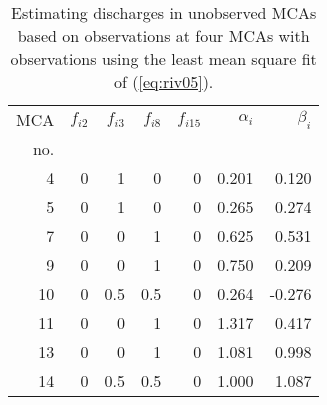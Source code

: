 \begin{table}[t]
 \caption{Estimating discharges in unobserved MCAs based on observations
 at four MCAs with observations using the least mean square fit of (\ref{eq:riv05}).}
 \label{tab:rivers04}       %
 \begin{center}
   \begin{tabular}{rrrrrrr}
   \hline
   MCA & $f_{i2}$ & $f_{i3}$ & $f_{i8}$ & $f_{i15}$ & $\alpha_i$ & $\beta_i$  \\
   no. &          &          &          &           &            &            \\ 
   \hline
   4   & 0        &  1       &  0       &  0        & 0.201      &  0.120     \\
   5   & 0        &  1       &  0       &  0        & 0.265      &  0.274     \\
   7   & 0        &  0       &  1       &  0        & 0.625      &  0.531     \\
   9   & 0        &  0       &  1       &  0        & 0.750      &  0.209     \\
   10  & 0        &  0.5     &  0.5     &  0        & 0.264      & -0.276     \\
   11  & 0        &  0       &  1       &  0        & 1.317      &  0.417     \\
   13  & 0        &  0       &  1       &  0        & 1.081      &  0.998     \\
   14  & 0        &  0.5     &  0.5     &  0        & 1.000      &  1.087     \\
   \hline
   \end{tabular}
 \end{center}
\end{table}

